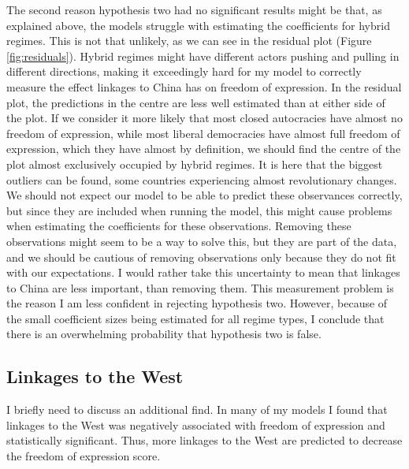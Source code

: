 The second reason hypothesis two had no significant results might be that, as explained above, the models struggle with estimating the coefficients for hybrid regimes. This is not that unlikely, as we can see in the residual plot (Figure \ref{fig:residuals}). Hybrid regimes might have different actors pushing and pulling in different directions, making it exceedingly hard for my model to correctly measure the effect linkages to China has on freedom of expression. In the residual plot, the predictions in the centre are less well estimated than at either side of the plot. If we consider it more likely that most closed autocracies have almost no freedom of expression, while most liberal democracies have almost full freedom of expression, which they have almost by definition, we should find the centre of the plot almost exclusively occupied by hybrid regimes. It is here that the biggest outliers can be found, some countries experiencing almost revolutionary changes. We should not expect our model to be able to predict these observances correctly, but since they are included when running the model, this might cause problems when estimating the coefficients for these observations. Removing these observations might seem to be a way to solve this, but they are part of the data, and we should be cautious of removing observations only because they do not fit with our expectations. I would rather take this uncertainty to mean that linkages to China are less important, than removing them. This measurement problem is the reason I am less confident in rejecting hypothesis two. However, because of the small coefficient sizes being estimated for all regime types, I conclude that there is an overwhelming probability that hypothesis two is false. 

\subsection{Linkages to the West}
I briefly need to discuss an additional find.  In many of my models I found that linkages to the West was negatively associated with freedom of expression and statistically significant. Thus, more linkages to the West are predicted to decrease the freedom of expression score.

